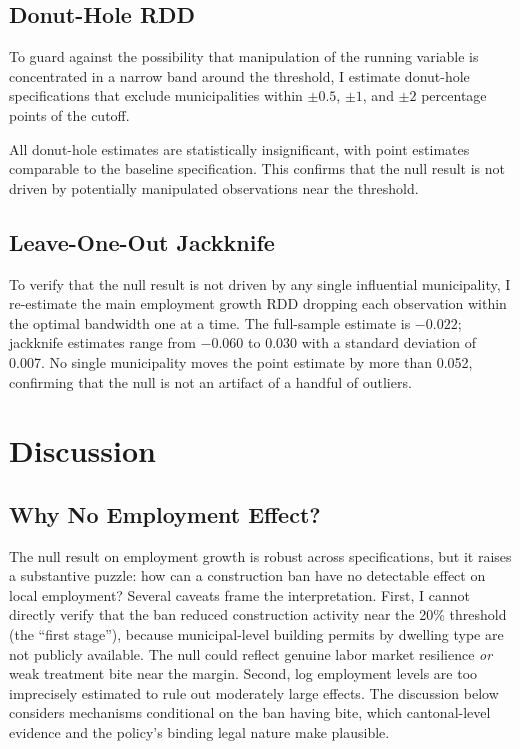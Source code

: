 \documentclass[12pt]{article}
\begin{document}
\subsection{Donut-Hole RDD}

To guard against the possibility that manipulation of the running variable is concentrated in a narrow band around the threshold, I estimate donut-hole specifications that exclude municipalities within $\pm 0.5$, $\pm 1$, and $\pm 2$ percentage points of the cutoff.



All donut-hole estimates are statistically insignificant, with point estimates comparable to the baseline specification. This confirms that the null result is not driven by potentially manipulated observations near the threshold.

\subsection{Leave-One-Out Jackknife}

To verify that the null result is not driven by any single influential municipality, I re-estimate the main employment growth RDD dropping each observation within the optimal bandwidth one at a time. The full-sample estimate is $-0.022$; jackknife estimates range from $-0.060$ to $0.030$ with a standard deviation of 0.007. No single municipality moves the point estimate by more than 0.052, confirming that the null is not an artifact of a handful of outliers.

\section{Discussion}\label{sec:discussion}

\subsection{Why No Employment Effect?}

The null result on employment growth is robust across specifications, but it raises a substantive puzzle: how can a construction ban have no detectable effect on local employment? Several caveats frame the interpretation. First, I cannot directly verify that the ban reduced construction activity near the 20\% threshold (the ``first stage''), because municipal-level building permits by dwelling type are not publicly available. The null could reflect genuine labor market resilience \textit{or} weak treatment bite near the margin. Second, log employment levels are too imprecisely estimated to rule out moderately large effects. The discussion below considers mechanisms conditional on the ban having bite, which cantonal-level evidence and the policy's binding legal nature make plausible.
\end{document}
